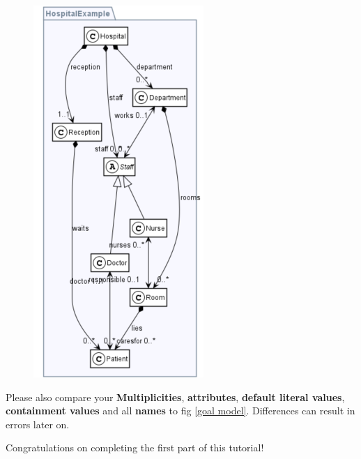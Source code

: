 \begin{figure}[h]
    \centering
    \includegraphics[scale=0.7]{pictures/goal_vis_PlantUML.png}
    \caption{}
    \label{plantUml goal}
\end{figure}

Please also compare your \textbf{Multiplicities}, \textbf{attributes}, \textbf{default literal values}, \textbf{containment values} and all \textbf{names} to fig \ref{goal model}. Differences can result in errors later on.\newline

Congratulations on completing the first part of this tutorial!

\clearpage
